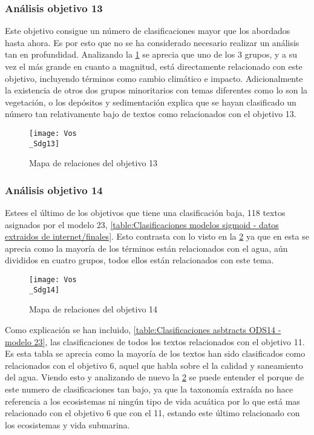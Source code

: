 \subsubsection{Análisis objetivo 13}
Este objetivo consigue un número de clasificaciones mayor que los abordados
hasta ahora. Es por esto que no se ha considerado necesario realizar un análisis
tan en profundidad. Analizando la \cref{Mapa de relaciones del objetivo 13} se
aprecia que uno de los 3 grupos, y a su vez el más grande en cuanto a magnitud,
está directamente relacionado con este objetivo, incluyendo términos como cambio
climático e impacto. Adicionalmente la existencia de otros dos grupos
minoritarios con temas diferentes como lo son la vegetación, o los depósitos y
sedimentación explica que se hayan clasificado un número tan relativamente bajo
de textos como relacionados con el objetivo 13.


\begin{figure}[H]
    \centering
    \texttt{[image: Vos\\\_Sdg13]}
    \captionsetup{justification=centering}
    \caption{Mapa de relaciones del objetivo 13}
    \label{Mapa de relaciones del objetivo 13}
\end{figure}

\subsubsection{Análisis objetivo 14}
Estees el último de los objetivos que tiene una clasificación baja, 118 textos
asignados por el modelo 23, \cref{table:Clasificaciones modelos sigmoid - datos
extraidos de internet/finales}. Esto contrasta con lo visto en la
\cref{Mapa de relaciones del objetivo 14} ya que en esta se aprecia como la mayoría de
los términos están relacionados con el agua, aún divididos en cuatro grupos,
todos ellos están relacionados con este tema.

\begin{figure}[H]
    \centering
    \texttt{[image: Vos\\\_Sdg14]}
    \captionsetup{justification=centering}
    \caption{Mapa de relaciones del objetivo 14}
    \label{Mapa de relaciones del objetivo 14}
\end{figure}

Como explicación se han incluido, \cref{table:Clasificaciones asbtracts ODS14 -
modelo 23}, las clasificaciones de todos los textos relacionados con el objetivo
11. Es esta tabla se aprecia como la mayoría de los textos han sido
clasificados como relacionados con el objetivo 6, aquel que habla sobre el la
calidad y saneamiento del agua. Viendo esto y analizando de nuevo la
\cref{Mapa de relaciones del objetivo 14} se puede entender el porque de este numero de
clasificaciones tan bajo, ya que la taxonomía extraída no hace referencia a los
ecosistemas ni ningún tipo de vida acuática por lo que está mas relacionado con
el objetivo 6 que con el 11, estando este último relacionado con los ecosistemas
y vida submarina.

